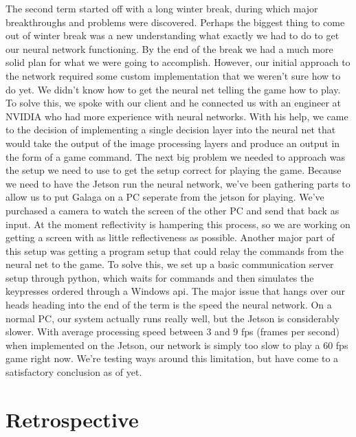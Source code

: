 \documentclass[onecolumn, draftclsnofoot,10pt, compsoc]{IEEEtran}
\begin{document}
\newline\newline
The second term started off with a long winter break, during which major breakthroughs and problems were discovered.
Perhaps the biggest thing to come out of winter break was a new understanding what exactly we had to do to get our neural network functioning.
By the end of the break we had a much more solid plan for what we were going to accomplish.
However, our initial approach to the network required some custom implementation that we weren't sure how to do yet.
We didn't know how to get the neural net telling the game how to play.
To solve this, we spoke with our client and he connected us with an engineer at NVIDIA who had more experience with neural networks.
With his help, we came to the decision of implementing a single decision layer into the neural net that would take the output of the image processing layers and produce an output in the form of a game command. 
\newline\newline
The next big problem we needed to approach was the setup we need to use to get the setup correct for playing the game.
Because we need to have the Jetson run the neural network, we've been gathering parts to allow us to put Galaga on a PC seperate from the jetson for playing.
We've purchased a camera to watch the screen of the other PC and send that back as input. 
At the moment reflectivity is hampering this process, so we are working on getting a screen with as little reflectiveness as possible.
Another major part of this setup was getting a program setup that could relay the commands from the neural net to the game.
To solve this, we set up a basic communication server setup through python, which waits for commands and then simulates the keypresses ordered through a Windows api.
\newline\newline
The major issue that hangs over our heads heading into the end of the term is the speed the neural network.
On a normal PC, our system actually runs really well, but the Jetson is considerably slower. 
With average processing speed between 3 and 9 fps (frames per second) when implemented on the Jetson, our network is simply too slow to play a 60 fps game right now.
We're testing ways around this limitation, but have come to a satisfactory conclusion as of yet.

\section{Retrospective}
\end{document}
